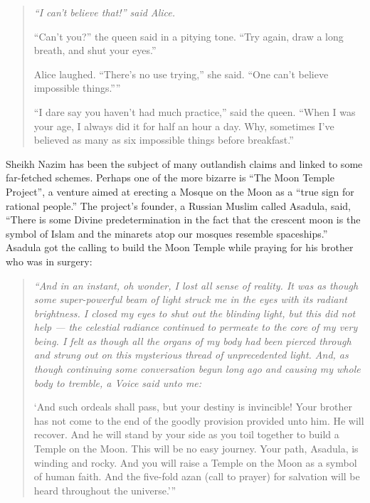 \documentclass[12pt]{memoir}
\def\–{-\hskip0pt}
\begin{document}
\begin{quote}
\itshape
“I can’t believe that!” said Alice.

“Can’t you?” the queen said in a pitying tone.
“Try again, draw a long breath, and shut your eyes.”

Alice laughed. “There’s no use trying,” she said.
“One can’t believe impossible things.”''

“I dare say you haven’t had much practice,” said the queen.
“When I was your age, I always did it for half an hour a day.
Why, sometimes I’ve believed as many as six impossible things
before breakfast.”
\end{quote}

Sheikh Nazim has been the subject of many outlandish claims
and linked to some far\–fetched schemes.
Perhaps one of the more bizarre is “The Moon Temple Project”,
a venture aimed at erecting a Mosque on the Moon
as a “true sign for rational people.”
The project’s founder, a Russian Muslim called Asadula, said,
“There is some Divine predetermination in the fact
that the crescent moon is the symbol of Islam
and the minarets atop our mosques resemble spaceships.”
Asadula got the calling to build the Moon Temple
while praying for his brother who was in surgery:

\begin{quote}
\itshape
“And in an instant, oh wonder, I lost all sense of reality.
It was as though some super-powerful beam of light struck me in the eyes
with its radiant brightness.
I closed my eyes to shut out the blinding light, but this did not help —
the celestial radiance continued to permeate to the core of my very being.
I felt as though all the organs of my body had been pierced through
and strung out on this mysterious thread of unprecedented light.
And, as though continuing some conversation begun long ago
and causing my whole body to tremble, a Voice said unto me:

‘And such ordeals shall pass, but your destiny is invincible!
Your brother has not come to the end
of the goodly provision provided unto him.
He will recover.
And he will stand by your side as you toil together
to build a Temple on the Moon.
This will be no easy journey.
Your path, Asadula, is winding and rocky.
And you will raise a Temple on the Moon as a symbol of human faith.
And the five-fold azan (call to prayer) for salvation
will be heard throughout the universe.’”
\end{quote}
\end{document}
